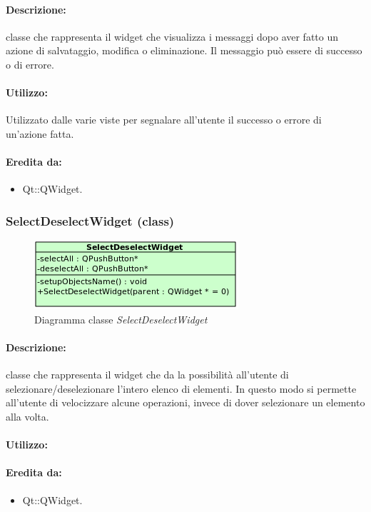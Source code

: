 	\paragraph{Descrizione:} classe che rappresenta il widget che visualizza i messaggi dopo aver fatto un azione di salvataggio, modifica o eliminazione.
Il messaggio può essere di successo o di errore.
	\paragraph{Utilizzo:} Utilizzato dalle varie viste per segnalare all'utente il successo o errore di un'azione fatta.
	\paragraph{Eredita da:}
		\begin{itemize}
			\item Qt::QWidget.
		\end{itemize}
	\subsubsection{SelectDeselectWidget (class)}
	\begin{figure}[!h]
		\centering
		\includegraphics[scale=2.75]{./Content/Immagini/view/SelectDeselectWidget}
		\caption{Diagramma classe \textsl{SelectDeselectWidget}}
	\end{figure}
	\paragraph{Descrizione:} classe che rappresenta il widget che da la possibilità all’utente di selezionare/deselezionare l’intero elenco di elementi.
In questo modo si permette all’utente di velocizzare alcune operazioni, invece di dover selezionare un elemento alla volta.
	\paragraph{Utilizzo:} 
	\paragraph{Eredita da:}
		\begin{itemize}
			\item Qt::QWidget.
		\end{itemize}

